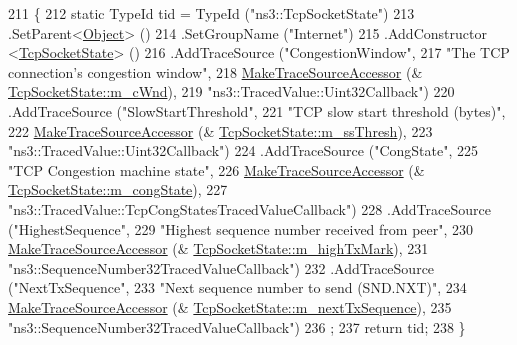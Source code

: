 \begin{DoxyCode}
211 \{
212   \textcolor{keyword}{static} TypeId tid = TypeId (\textcolor{stringliteral}{"ns3::TcpSocketState"})
213     .SetParent<\hyperlink{classns3_1_1Object_a40860402e64d8008fb42329df7097cdb}{Object}> ()
214     .SetGroupName (\textcolor{stringliteral}{"Internet"})
215     .AddConstructor <\hyperlink{classns3_1_1TcpSocketState_aa88a545b660d9a6ce28576522829bbf6}{TcpSocketState}> ()
216     .AddTraceSource (\textcolor{stringliteral}{"CongestionWindow"},
217                      \textcolor{stringliteral}{"The TCP connection's congestion window"},
218                      \hyperlink{group__tracing_gab21a770b9855af4e8f69f7531ea4a6b0}{MakeTraceSourceAccessor} (&
      \hyperlink{classns3_1_1TcpSocketState_a7cd3d2156a483c1db436097477a0fd7f}{TcpSocketState::m\_cWnd}),
219                      \textcolor{stringliteral}{"ns3::TracedValue::Uint32Callback"})
220     .AddTraceSource (\textcolor{stringliteral}{"SlowStartThreshold"},
221                      \textcolor{stringliteral}{"TCP slow start threshold (bytes)"},
222                      \hyperlink{group__tracing_gab21a770b9855af4e8f69f7531ea4a6b0}{MakeTraceSourceAccessor} (&
      \hyperlink{classns3_1_1TcpSocketState_aec003b6dba9d269bfb1036c7652ffbd6}{TcpSocketState::m\_ssThresh}),
223                      \textcolor{stringliteral}{"ns3::TracedValue::Uint32Callback"})
224     .AddTraceSource (\textcolor{stringliteral}{"CongState"},
225                      \textcolor{stringliteral}{"TCP Congestion machine state"},
226                      \hyperlink{group__tracing_gab21a770b9855af4e8f69f7531ea4a6b0}{MakeTraceSourceAccessor} (&
      \hyperlink{classns3_1_1TcpSocketState_a4053e1eb120c572d0881b04620b52c30}{TcpSocketState::m\_congState}),
227                      \textcolor{stringliteral}{"ns3::TracedValue::TcpCongStatesTracedValueCallback"})
228     .AddTraceSource (\textcolor{stringliteral}{"HighestSequence"},
229                      \textcolor{stringliteral}{"Highest sequence number received from peer"},
230                      \hyperlink{group__tracing_gab21a770b9855af4e8f69f7531ea4a6b0}{MakeTraceSourceAccessor} (&
      \hyperlink{classns3_1_1TcpSocketState_a2c46f51fd8e2bf43b564ea838b43b8bb}{TcpSocketState::m\_highTxMark}),
231                      \textcolor{stringliteral}{"ns3::SequenceNumber32TracedValueCallback"})
232     .AddTraceSource (\textcolor{stringliteral}{"NextTxSequence"},
233                      \textcolor{stringliteral}{"Next sequence number to send (SND.NXT)"},
234                      \hyperlink{group__tracing_gab21a770b9855af4e8f69f7531ea4a6b0}{MakeTraceSourceAccessor} (&
      \hyperlink{classns3_1_1TcpSocketState_ad1f77b1cbdb9267a89ebb6f16ac76892}{TcpSocketState::m\_nextTxSequence}),
235                      \textcolor{stringliteral}{"ns3::SequenceNumber32TracedValueCallback"})
236   ;
237   \textcolor{keywordflow}{return} tid;
238 \}
\end{DoxyCode}


